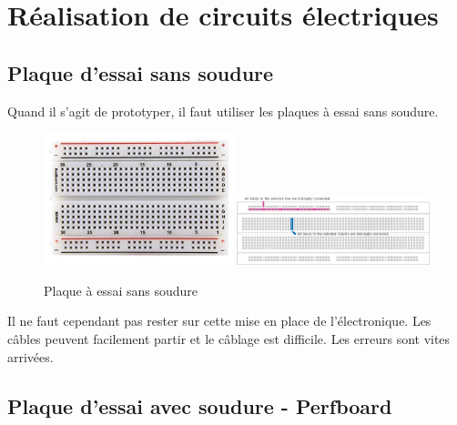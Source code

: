 \documentclass[a4paper, 11pt]{report}
\begin{document}
\section{Réalisation de circuits électriques}

\subsection{Plaque d'essai sans soudure}
Quand il s'agit de prototyper, il faut utiliser les plaques à essai sans soudure.

\begin{figure}[h]
\caption{Plaque à essai sans soudure}

\centering{}\includegraphics[width=0.5\textwidth]{images/breadboard.jpg}\includegraphics[width=0.5\textwidth]{images/breadboardConnections.jpg}
\end{figure}

Il ne faut cependant pas rester sur cette mise en place de l'électronique. Les câbles peuvent facilement partir et le câblage est difficile. Les erreurs sont vites arrivées.

\subsection{Plaque d'essai avec soudure - Perfboard}
\end{document}
